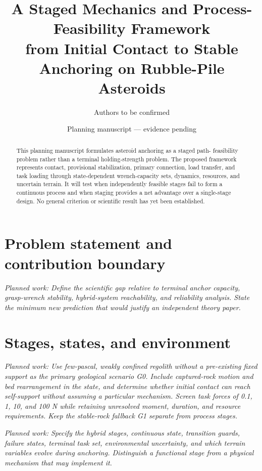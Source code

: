 \documentclass[11pt]{article}
\title{A Staged Mechanics and Process-Feasibility Framework\\
from Initial Contact to Stable Anchoring on Rubble-Pile Asteroids}
\author{Authors to be confirmed}
\date{Planning manuscript --- evidence pending}
\newcommand{\planned}[1]{\par\noindent\textit{Planned work: #1}\par}
\begin{document}
\maketitle

\begin{abstract}
This planning manuscript formulates asteroid anchoring as a staged path-
feasibility problem rather than a terminal holding-strength problem. The proposed
framework represents contact, provisional stabilization, primary connection,
load transfer, and task loading through state-dependent wrench-capacity sets,
dynamics, resources, and uncertain terrain. It will test when independently
feasible stages fail to form a continuous process and when staging provides a net
advantage over a single-stage design. No general criterion or scientific result
has yet been established.
\end{abstract}

\section{Problem statement and contribution boundary}
\planned{Define the scientific gap relative to terminal anchor capacity,
grasp-wrench stability, hybrid-system reachability, and reliability analysis.
State the minimum new prediction that would justify an independent theory paper.}

\section{Stages, states, and environment}

\planned{Use few-pascal, weakly confined regolith without a pre-existing fixed
support as the primary geological scenario G0. Include captured-rock motion
and bed rearrangement in the state, and determine whether initial contact can
reach self-support without assuming a particular mechanism. Screen task forces
of 0.1, 1, 10, and 100 N while retaining unresolved moment, duration, and resource
requirements. Keep the stable-rock fallback G1 separate from process stages.}
\planned{Specify the hybrid stages, continuous state, transition guards,
failure states, terminal task set, environmental uncertainty, and which terrain
variables evolve during anchoring. Distinguish a functional stage from a physical
mechanism that may implement it.}
\end{document}
